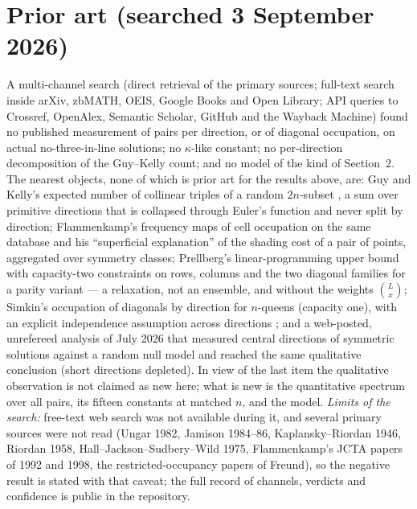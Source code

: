 \documentclass[11pt,a4paper]{article}
\begin{document}
\section{Prior art (searched 3 September 2026)}\label{s:prior}
A multi-channel search (direct retrieval of the primary sources; full-text search inside arXiv, zbMATH, OEIS,
Google Books and Open Library; API queries to Crossref, OpenAlex, Semantic Scholar, GitHub and the Wayback Machine)
found no published measurement of pairs per direction, or of diagonal occupation, on actual no-three-in-line solutions;
no $\kappa$-like constant; no per-direction decomposition of the Guy--Kelly count; and no model of the kind of
Section~2.  The nearest objects, none of which is prior art for the results above, are: Guy and Kelly's expected number
of collinear triples of a random $2n$-subset \cite{GuyKelly}, a sum over primitive directions that is collapsed through
Euler's function and never split by direction; Flammenkamp's frequency maps of cell occupation on the same database
\cite{Density} and his ``superficial explanation'' of the shading cost of a pair of points, aggregated over symmetry
classes; Prellberg's linear-programming upper bound with capacity-two constraints on rows, columns and the two diagonal
families for a parity variant \cite{PrellbergCB} --- a relaxation, not an ensemble, and without the weights
$\binom{L}{x}$; Simkin's occupation of diagonals by direction for $n$-queens (capacity one), with an explicit independence
assumption across directions \cite{Simkin}; and a web-posted, unrefereed analysis of July 2026 \cite{Du} that measured
central directions of symmetric solutions against a random null model and reached the same qualitative conclusion
(short directions depleted).  In view of the last item the qualitative observation is not claimed as new here; what is
new is the quantitative spectrum over all pairs, its fifteen constants at matched $n$, and the model.
\emph{Limits of the search:} free-text web search was not available during it, and several primary sources were not
read (Ungar 1982, Jamison 1984--86, Kaplansky--Riordan 1946, Riordan 1958, Hall--Jackson--Sudbery--Wild 1975,
Flammenkamp's JCTA papers of 1992 and 1998, the restricted-occupancy papers of Freund), so the negative result is stated
with that caveat; the full record of channels, verdicts and confidence is public in the repository.
\end{document}

